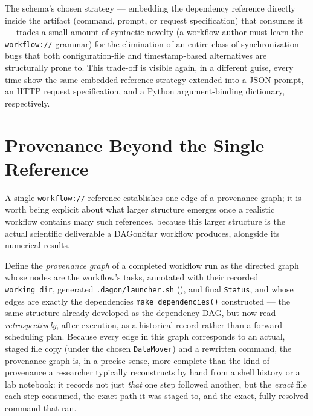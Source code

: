 \begin{practicebox}
The schema's chosen strategy --- embedding the dependency reference directly
inside the artifact (command, prompt, or request specification) that
consumes it --- trades a small amount of syntactic novelty (a workflow
author must learn the \texttt{workflow://} grammar) for the elimination of
an entire class of synchronization bugs that both configuration-file and
timestamp-based alternatives are structurally prone to. This trade-off is
visible again, in a different guise, every time 
show the same embedded-reference strategy extended into a JSON prompt, an
HTTP request specification, and a Python argument-binding dictionary,
respectively.
\end{practicebox}

\section{Provenance Beyond the Single Reference}

A single \texttt{workflow://} reference establishes one edge of a
provenance graph; it is worth being explicit about what larger structure
emerges once a realistic workflow contains many such references, because
this larger structure is the actual scientific deliverable a DAGonStar
workflow produces, alongside its numerical results.

Define the \emph{provenance graph} of a completed workflow run as the
directed graph whose nodes are the workflow's tasks, annotated with their
recorded \texttt{working\_dir}, generated \texttt{.dagon/launcher.sh}
(), and final \texttt{Status}, and whose edges are
exactly the dependencies \texttt{make\_dependencies()} constructed --- the
same structure already developed as the dependency DAG, but now read
\emph{retrospectively}, after execution, as a historical record rather than
a forward scheduling plan. Because every edge in this graph corresponds to
an actual, staged file copy (under the chosen \texttt{DataMover}) and a
rewritten command, the provenance graph is, in a precise sense, more
complete than the kind of provenance a researcher typically reconstructs by
hand from a shell history or a lab notebook: it records not just \emph{that}
one step followed another, but the \emph{exact} file each step consumed,
the exact path it was staged to, and the exact, fully-resolved command that
ran.

